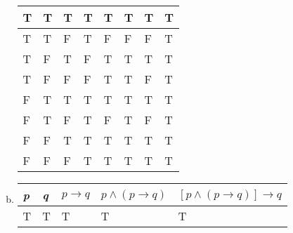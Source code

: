 \begin{itemize}
\begin{enumerate}[a.]
\begin{tabular}{|l|l|l|l|l|l|l|p{3cm}|}
                        \hline
                        T          & T          & T          & T         & T         & T         & T                             & T                                                    \\
                        \hline
                        T          & T          & F          & T         & F         & F         & F                             & T                                                    \\
                        \hline
                        T          & F          & T          & F         & T         & T         & T                             & T                                                    \\
                        \hline
                        T          & F          & F          & F         & T         & T         & F                             & T                                                    \\
                        \hline
                        F          & T          & T          & T         & T         & T         & T                             & T                                                    \\
                        \hline
                        F          & T          & F          & T         & F         & T         & F                             & T                                                    \\
                        \hline
                        F          & F          & T          & T         & T         & T         & T                             & T                                                    \\
                        \hline
                        F          & F          & F          & T         & T         & T         & T                             & T                                                    \\
                        \hline
                    \end{tabular}
              \item
                    \begin{tabular}{*{5}{|l}|}
                        \hline
                        \textit{p} & \textit{q} & $p \to q$ & $p \land (p \to q)$ & $[p \land (p \to q)] \to q$ \\
                        \hline
                        T          & T          & T         & T                   & T                           \\

\end{tabular}
\end{enumerate}
\end{itemize}
